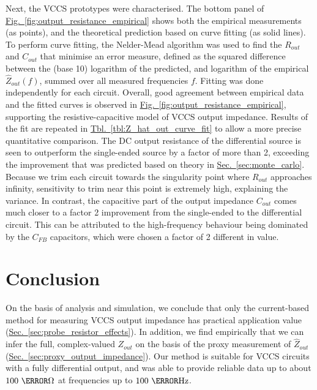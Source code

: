 \documentclass[conference]{IEEEtran}
\newcommand{\brieftbllink}[1]{\hyperref[#1]{Tbl.~\ref*{#1}}\xspace }
\newcommand{\briefseclink}[1]{\hyperref[#1]{Sec.~\ref*{#1}}}
\newcommand{\brieffiglink}[1]{\hyperref[#1]{Fig.~\ref*{#1}}}
\begin{document}
Next, the VCCS prototypes were characterised. The bottom panel of \brieffiglink{fig:output_resistance_empirical} shows both the empirical measurements (as points), and the theoretical prediction based on curve fitting (as solid lines). To perform curve fitting, the Nelder-Mead algorithm \cite{neldermead} was used to find the $R_{out}$ and $C_{out}$ that minimise an error measure, defined as the squared difference between the (base 10) logarithm of the predicted, and logarithm of the empirical $\hat{Z}_{out}(f)$, summed over all measured frequencies $f$. Fitting was done independently for each circuit. Overall, good agreement between empirical data and the fitted curves is observed in \brieffiglink{fig:output_resistance_empirical}, supporting the resistive-capacitive model of VCCS output impedance. Results of the fit are repeated in \brieftbllink{tbl:Z_hat_out_curve_fit} to allow a more precise quantitative comparison. The DC output resistance of the differential source is seen to outperform the single-ended source by a factor of more than 2, exceeding the improvement that was predicted based on theory in \briefseclink{sec:monte_carlo}. Because we trim each circuit towards the singularity point where $R_{out}$ approaches infinity, sensitivity to trim near this point is extremely high, explaining the variance. In contrast, the capacitive part of the output impedance $C_{out}$ comes much closer to a factor 2 improvement from the single-ended to the differential circuit. This can be attributed to the high-frequency behaviour being dominated by the $C_{FB}$ capacitors, which were chosen a factor of 2 different in value.


\section{Conclusion}
\label{sec:conclusion}

On the basis of analysis and simulation, we conclude that only the current-based method for measuring VCCS output impedance has practical application value (\briefseclink{sec:probe_resistor_effects}). In addition, we find empirically that we can infer the full, complex-valued $Z_{out}$ on the basis of the proxy measurement of $\hat{Z}_{out}$ (\briefseclink{sec:proxy_output_impedance}). Our method is suitable for VCCS circuits with a fully differential output, and was able to provide reliable data up to about $100~\mega\ohm$ at frequencies up to $100~\kilo\hertz$.
\end{document}
